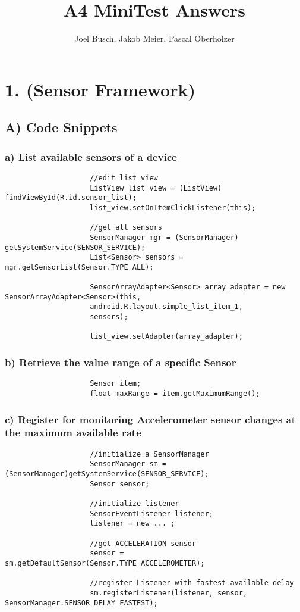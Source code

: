 \documentclass[10pt,a4paper]{report}
\title{A4 MiniTest Answers}
\author{Joel Busch, Jakob Meier, Pascal Oberholzer}
\begin{document}
	\maketitle
	
	\section*{1. (Sensor Framework)}
		\subsection*{A) Code Snippets}
			\subsubsection*{a) List available sensors of a device}
				\begin{lstlisting}
					//edit list_view
					ListView list_view = (ListView) findViewById(R.id.sensor_list);
					list_view.setOnItemClickListener(this);
					
					//get all sensors
					SensorManager mgr = (SensorManager) getSystemService(SENSOR_SERVICE);
					List<Sensor> sensors = mgr.getSensorList(Sensor.TYPE_ALL);
					
					SensorArrayAdapter<Sensor> array_adapter = new SensorArrayAdapter<Sensor>(this,
					android.R.layout.simple_list_item_1,
					sensors);
					
					list_view.setAdapter(array_adapter);
				\end{lstlisting}

			\subsubsection*{b) Retrieve the value range of a specific Sensor}
				\begin{lstlisting}
					Sensor item;
					float maxRange = item.getMaximumRange();
				\end{lstlisting}

			\subsubsection*{c) Register for monitoring Accelerometer sensor changes at the maximum available rate}
				\begin{lstlisting}
					//initialize a SensorManager
					SensorManager sm = (SensorManager)getSystemService(SENSOR_SERVICE);
					Sensor sensor;
					
					//initialize listener
					SensorEventListener listener;
					listener = new ... ;
					
					//get ACCELERATION sensor
					sensor = sm.getDefaultSensor(Sensor.TYPE_ACCELEROMETER);
					
					//register Listener with fastest available delay
					sm.registerListener(listener, sensor, SensorManager.SENSOR_DELAY_FASTEST);
				\end{lstlisting}
				
\end{document}
